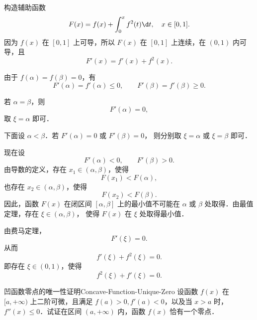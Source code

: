 \begin{myproof}
    构造辅助函数
    \begin{equation}
        F(x) = f(x) + \int_0^x f^2(t) \d t,\quad x\in[0,1].
    \end{equation}
    因为 $f(x)$ 在 $[0,1]$ 上可导，所以 $F(x)$ 在 $[0,1]$ 上连续，在 $(0,1)$ 内可导，且
    \begin{equation}
        F'(x) = f'(x) + f^2(x).
    \end{equation}

    由于 $f(\alpha)=f(\beta)=0$，有
    \begin{equation}
        F'(\alpha)=f'(\alpha)\leqslant0,\qquad
        F'(\beta)=f'(\beta)\geqslant0.
    \end{equation}

    若 $\alpha=\beta$，则
    \begin{equation}
        F'(\alpha)=0,
    \end{equation}
    取 $\xi=\alpha$ 即可．

    下面设 $\alpha<\beta$．若 $F'(\alpha)=0$ 或 $F'(\beta)=0$，
    则分别取 $\xi=\alpha$ 或 $\xi=\beta$ 即可．

    现在设
    \begin{equation}
        F'(\alpha)<0,\qquad F'(\beta)>0.
    \end{equation}
    由导数的定义，存在 $x_1\in(\alpha,\beta)$，使得
    \begin{equation}
        F(x_1)<F(\alpha),
    \end{equation}
    也存在 $x_2\in(\alpha,\beta)$，使得
    \begin{equation}
        F(x_2)<F(\beta).
    \end{equation}
    因此，函数 $F(x)$ 在闭区间 $[\alpha,\beta]$ 上的最小值不可能在
    $\alpha$ 或 $\beta$ 处取得．由最值定理，存在 $\xi\in(\alpha,\beta)$，
    使得 $F(x)$ 在 $\xi$ 处取得最小值．

    由费马定理，
    \begin{equation}
        F'(\xi)=0.
    \end{equation}
    从而
    \begin{equation}
        f'(\xi)+f^2(\xi)=0.
    \end{equation}
    即存在 $\xi\in(0,1)$，使得
    \begin{equation}
        f^2(\xi)+f'(\xi)=0.
    \end{equation}
\end{myproof}

\begin{problem}{凹函数零点的唯一性证明}{Concave-Function-Unique-Zero}
    设函数 $f(x)$ 在 $[a, +\infty)$ 上二阶可微，且满足 $f(a) > 0, f'(a) < 0$，以及当 $x > a$ 时，$f''(x) \leqslant 0$．试证在区间 $(a, +\infty)$ 内，函数 $f(x)$ 恰有一个零点．
\end{problem}


